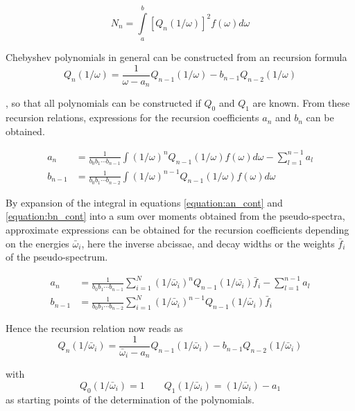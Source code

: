 \begin{equation}
  N_n = \int\limits_a^b \left[ Q_n(1/\omega) \right]^2 f(\omega) d\omega
\end{equation}

Chebyshev polynomials in general can be constructed from an recursion formula
\begin{equation}
  Q_n(1/\omega) = \frac{1}{\omega - a_n} Q_{n-1}(1/\omega) - b_{n-1} Q_{n-2}(1/\omega)
\end{equation}

, so that all polynomials can be constructed if $Q_0$ and $Q_1$ are known.
From these recursion relations, expressions for the recursion coefficients
$a_n$ and $b_n$ can be obtained.

\begin{align}
  a_n     &= \frac{1}{b_0b_1\cdots b_{n-1}}
             \int (1/\omega)^n Q_{n-1}(1/\omega) f(\omega) d\omega
             - \sum\limits_{l=1}^{n-1} a_l  \label{equation:an_cont}\\
  b_{n-1} &= \frac{1}{b_0b_1\cdots b_{n-2}}
             \int (1/\omega)^{n-1} Q_{n-1}(1/\omega) f(\omega) d\omega \label{equation:bn_cont}
\end{align}

By expansion of the integral in equations \ref{equation:an_cont} and
\ref{equation:bn_cont} into a sum over moments obtained from the pseudo-spectra,
approximate expressions can be obtained for the recursion coefficients
depending on the energies $\bar{\omega}_i$, here the inverse abcissae,
and decay widths or the weights $\bar{f}_i$ of the
pseudo-spectrum.

\begin{align}
  a_n     &= \frac{1}{b_0b_1\cdots b_{n-1}}
             \sum\limits_{i=1}^N
               (1/\bar{\omega}_i)^n Q_{n-1}(1/\bar{\omega_i}) \bar{f}_i
             - \sum\limits_{l=1}^{n-1} a_l \label{equation:an_disc}\\
  b_{n-1} &= \frac{1}{b_0b_1\cdots b_{n-2}}
             \sum\limits_{i=1}^N
               (1/\bar{\omega}_i)^{n-1} Q_{n-1}(1/\bar{\omega}_i) \bar{f}_i
\end{align}

Hence the recursion relation now reads as
\begin{equation}
  Q_n(1/\bar{\omega}_i) = \frac{1}{\bar{\omega}_i - a_n} Q_{n-1}(1/\bar{\omega}_i)
                          - b_{n-1} Q_{n-2}(1/\bar{\omega}_i)
\end{equation}

with
\begin{equation}
  Q_0(1/\bar{\omega}_i) = 1 \quad\quad Q_1(1/\bar{\omega}_i) = (1/\bar{\omega}_i) - a_1
\end{equation}
as starting points of the determination of the polynomials.

